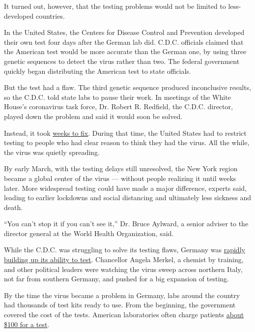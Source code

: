 It turned out, however, that the testing problems would not be limited
to less-developed countries.

In the United States, the Centers for Disease Control and Prevention
developed their own test four days after the German lab did. C.D.C.
officials claimed that the American test would be more accurate than the
German one, by using three genetic sequences to detect the virus rather
than two. The federal government quickly began distributing the American
test to state officials.

But the test had a flaw. The third genetic sequence produced
inconclusive results, so the C.D.C. told state labs to pause their work.
In meetings of the White House's coronavirus task force, Dr. Robert R.
Redfield, the C.D.C. director, played down the problem and said it would
soon be solved.

Instead, it took
\href{https://www.nytimes.com/2020/03/28/us/testing-coronavirus-pandemic.html}{weeks
to fix}. During that time, the United States had to restrict testing to
people who had clear reason to think they had the virus. All the while,
the virus was quietly spreading.

By early March, with the testing delays still unresolved, the New York
region became a global center of the virus --- without people realizing
it until weeks later. More widespread testing could have made a major
difference, experts said, leading to earlier lockdowns and social
distancing and ultimately less sickness and death.

``You can't stop it if you can't see it,'' Dr. Bruce Aylward, a senior
adviser to the director general at the World Health Organization, said.

While the C.D.C. was struggling to solve its testing flaws, Germany was
\href{https://www.nytimes.com/2020/04/04/world/europe/germany-coronavirus-death-rate.html}{rapidly
building up its ability to test}. Chancellor Angela Merkel, a chemist by
training, and other political leaders were watching the virus sweep
across northern Italy, not far from southern Germany, and pushed for a
big expansion of testing.

By the time the virus became a problem in Germany, labs around the
country had thousands of test kits ready to use. From the beginning, the
government covered the cost of the tests. American laboratories often
charge patients
\href{https://www.nytimes.com/2020/06/16/upshot/coronavirus-test-cost-varies-widely.html}{about
\$100 for a test}.

